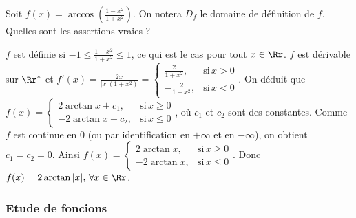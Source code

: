 \begin{question} 

Soit $f(x)= \arccos (\frac{1-x^2}{1+x^2})$. On notera $D_f$ le domaine de définition de $f$. Quelles sont les assertions vraies ?
\begin{answers}



\end{answers}
\begin{explanations}
$f$ est définie si $-1\le \frac{1-x^2}{1+x^2} \le 1 $, ce qui est le cas pour tout $x \in \Rr$.
$f$ est dérivable sur $\Rr^*$ et $f'(x) = \frac{2x}{|x|(1+x^2)} =\left\{\begin{array}{cc}\frac{2}{1+x^2},& \mbox{si} \, x>0 \\ -\frac{2}{1+x^2},& \mbox{si} \, x<0 \end{array}\right. $. 
On déduit que 
$f(x)= \left\{\begin{array}{cc}2\arctan x + c_1, & \mbox{si} \, x\ge 0 \\ -2\arctan x + c_2, & \mbox{si} \, x\le 0 \end{array}\right. $, où $c_1$ et $ c_2$  sont des constantes.
Comme $f$ est continue en $0$ (ou par identification en $+\infty$ et en $-\infty$), on obtient $c_1=c_2=0$. Ainsi 
$f(x)= \left\{\begin{array}{cc}2\arctan x, & \mbox{si} \, x\ge 0 \\ -2\arctan x, & \mbox{si} \, x\le 0 \end{array}\right.$.  Donc $f(x)  = 2\arctan |x|, \, \forall x \in \Rr$.

\end{explanations}

\end{question}




\subsubsection{Etude de foncions}


